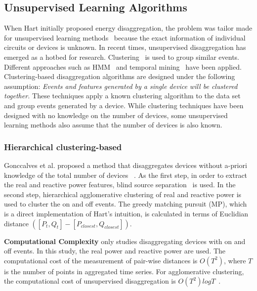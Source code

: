 \subsection{Unsupervised Learning Algorithms}
\label{sec:unsupervised}
When Hart initially proposed energy disaggregation,
the problem was tailor made for unsupervised learning methods~\cite{hart1992} because
the exact information of individual circuits or devices
is unknown.
In recent times, unsupervised disaggregation has emerged as a hotbed for research. 
Clustering~\cite{gonccalves2011unsupervised} is used to group similar events. Different approaches such as 
HMM~\cite{kim2011unsupervised,kolter2012aistat,parson2012nonintrusive} and temporal mining~\cite{shao2012temporal} have been applied. 
Clustering-based disaggregation algorithms are designed under the following assumption:
{\em Events and features generated by a single device will be clustered together.}
These techniques apply a known clustering algorithm to the data set and group events generated by a device.
While clustering techniques have been designed with no knowledge on the number of devices, some unsupervised learning methods also assume that the number of devices is also known.
 
\subsubsection{Hierarchical clustering-based}
Gonccalves et al. proposed a method that disaggregates devices without a-priori knowledge of the total number of devices ~\cite{gonccalves2011unsupervised}. 
As the first step, in order to extract the real and reactive power features, blind source separation~\cite{lee1999blindsource} is used. 
In the second step, hierarchical agglomerative clustering of real and reactive power is used to cluster the on and off events.
The greedy matching pursuit (MP), which is a direct implementation of Hart's intuition,
is calculated in terms of Euclidian distance
$([P_t,Q_t]-[P_{closest},Q_{closest}])$.

\textbf{Computational Complexity}
\cite{gonccalves2011unsupervised} only studies disaggregating devices with 
on and off events. 
In this study, the real power and reactive power are used. 
The computational cost of the measurement of pair-wise distances 
is $O(T^2)$, where $T$ is the number of points in aggregated time series. 
For agglomerative clustering, 
the computational cost of unsupervised 
disaggregation is $O(T^2)logT$~\cite{jain1999data}. 

